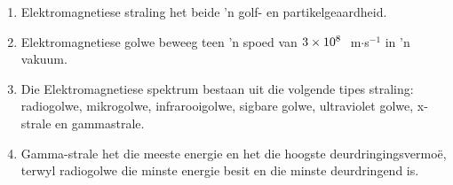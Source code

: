 \begin{enumerate}[noitemsep, label=\textbf{\arabic*}. ] 
\item Elektromagnetiese straling het beide 'n golf- en partikelgeaardheid.
\item Elektromagnetiese golwe beweeg teen 'n spoed van $3\ensuremath{\times}{10}^{8}\phantom{\rule{3.33333pt}{0ex}}$ m$\cdot$s$^{-1}$ in 'n vakuum.
\item Die Elektromagnetiese spektrum bestaan uit die volgende tipes straling: radiogolwe, mikrogolwe, infrarooigolwe, sigbare golwe, ultraviolet golwe, x-strale en gammastrale. 
\item Gamma-strale het die meeste energie en het die hoogste deurdringingsvermo\"e, terwyl radiogolwe die minste energie besit en die minste deurdringend is. 
\end{enumerate}

